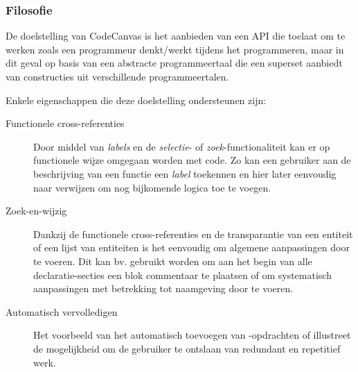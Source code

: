 \subsubsection{Filosofie}

De doelstelling van CodeCanvas is het aanbieden van een API die toelaat om te
werken zoals een programmeur denkt/werkt tijdens het programmeren, maar in dit
geval op basis van een abstracte programmeertaal die een superset aanbiedt van
constructies uit verschillende programmeertalen.

Enkele eigenschappen die deze doelstelling ondersteunen zijn:

\begin{description}

  \item[Functionele cross-referenties] Door middel van \emph{labels} en de
  \emph{selectie}- of \emph{zoek}-functionaliteit kan er op functionele wijze
  omgegaan worden met code. Zo kan een gebruiker aan de beschrijving van een
  functie een \emph{label} toekennen en hier later eenvoudig naar verwijzen om
  nog bijkomende logica toe te voegen.

  \item[Zoek-en-wijzig] Dankzij de functionele cross-referenties en de
  transparantie van een entiteit of een lijst van entiteiten is het eenvoudig
  om algemene aanpassingen door te voeren. Dit kan bv. gebruikt worden om aan
  het begin van alle declaratie-secties een blok commentaar te plaatsen of om
  systematisch aanpassingen met betrekking tot naamgeving door te voeren.

  \item[Automatisch vervolledigen] Het voorbeeld van het automatisch toevoegen
  van -opdrachten of  illustreet de mogelijkheid om
  de gebruiker te ontslaan van redundant en repetitief werk.

\end{description}
